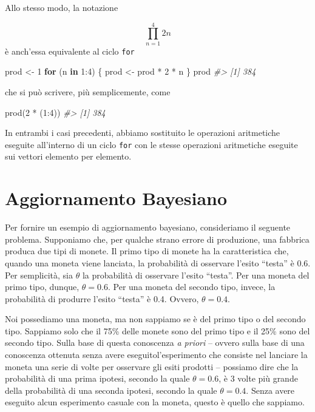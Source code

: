 \documentclass[
  11pt,
]{krantz}
\makeatletter
\newenvironment{Shaded}{\begin{snugshade}}{\end{snugshade}}
\newcommand{\CommentTok}[1]{\textcolor[rgb]{0.37,0.37,0.37}{\textit{#1}}}
\newcommand{\ControlFlowTok}[1]{\textcolor[rgb]{0.27,0.27,0.27}{\textbf{#1}}}
\newcommand{\DecValTok}[1]{\textcolor[rgb]{0.06,0.06,0.06}{#1}}
\newcommand{\FunctionTok}[1]{\textcolor[rgb]{0,0,0}{#1}}
\newcommand{\NormalTok}[1]{#1}
\newcommand{\OtherTok}[1]{\textcolor[rgb]{0.37,0.37,0.37}{#1}}
\newcommand{\SpecialCharTok}[1]{\textcolor[rgb]{0,0,0}{#1}}
\newenvironment{kframe}{%
\medskip{}
\setlength{\fboxsep}{.8em}
 \def\at@end@of@kframe{}%
 \ifinner\ifhmode%
  \def\at@end@of@kframe{\end{minipage}}%
  \begin{minipage}{\columnwidth}%
 \fi\fi%
 \def\FrameCommand##1{\hskip\@totalleftmargin \hskip-\fboxsep
 \colorbox{shadecolor}{##1}\hskip-\fboxsep
     \hskip-\linewidth \hskip-\@totalleftmargin \hskip\columnwidth}%
 \MakeFramed {\advance\hsize-\width
   \@totalleftmargin\z@ \linewidth\hsize
   \@setminipage}}%
 {\par\unskip\endMakeFramed%
 \at@end@of@kframe}
\renewenvironment{Shaded}{\begin{kframe}}{\end{kframe}}
\theoremstyle{definition}
\theoremstyle{definition}
\theoremstyle{definition}
\theoremstyle{definition}
\theoremstyle{remark}
\makeatother
\begin{document}
Allo stesso modo, la notazione

\[
\prod_{n=1}^{4} 2n
\] è anch'essa equivalente al ciclo \texttt{for}

\begin{Shaded}
\begin{Highlighting}[]
\NormalTok{prod }\OtherTok{\textless{}{-}} \DecValTok{1}
\ControlFlowTok{for}\NormalTok{ (n }\ControlFlowTok{in} \DecValTok{1}\SpecialCharTok{:}\DecValTok{4}\NormalTok{) \{}
\NormalTok{  prod }\OtherTok{\textless{}{-}}\NormalTok{ prod }\SpecialCharTok{*} \DecValTok{2} \SpecialCharTok{*}\NormalTok{ n}
\NormalTok{\}}
\NormalTok{prod}
\CommentTok{\#\textgreater{} [1] 384}
\end{Highlighting}
\end{Shaded}

che si può scrivere, più semplicemente, come

\begin{Shaded}
\begin{Highlighting}[]
\FunctionTok{prod}\NormalTok{(}\DecValTok{2} \SpecialCharTok{*}\NormalTok{ (}\DecValTok{1}\SpecialCharTok{:}\DecValTok{4}\NormalTok{))}
\CommentTok{\#\textgreater{} [1] 384}
\end{Highlighting}
\end{Shaded}

In entrambi i casi precedenti, abbiamo sostituito le operazioni aritmetiche eseguite all'interno di un ciclo \texttt{for} con le stesse operazioni aritmetiche eseguite sui vettori elemento per elemento.

\hypertarget{appendix:bayes-updating}{%
\chapter{Aggiornamento Bayesiano}\label{appendix:bayes-updating}}

Per fornire un esempio di aggiornamento bayesiano, consideriamo il seguente problema. Supponiamo che, per qualche strano errore di produzione, una fabbrica produca due tipi di monete. Il primo tipo di monete ha la caratteristica che, quando una moneta viene lanciata, la probabilità di osservare l'esito ``testa'' è 0.6. Per semplicità, sia \(\theta\) la probabilità di osservare l'esito ``testa''. Per una moneta del primo tipo, dunque, \(\theta = 0.6\). Per una moneta del secondo tipo, invece, la probabilità di produrre l'esito ``testa'' è 0.4. Ovvero, \(\theta = 0.4\).

Noi possediamo una moneta, ma non sappiamo se è del primo tipo o del secondo tipo. Sappiamo solo che il 75\% delle monete sono del primo tipo e il 25\% sono del secondo tipo. Sulla base di questa conoscenza \emph{a priori} -- ovvero sulla base di una conoscenza ottenuta senza avere eseguitol'esperimento che consiste nel lanciare la moneta una serie di volte per osservare gli esiti prodotti -- possiamo dire che la probabilità di una prima ipotesi, secondo la quale \(\theta = 0.6\), è 3 volte più grande della probabilità di una seconda ipotesi, secondo la quale \(\theta = 0.4\). Senza avere eseguito alcun esperimento casuale con la moneta, questo è quello che sappiamo.
\end{document}
